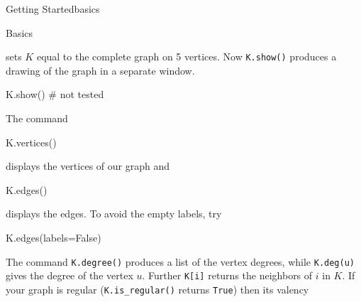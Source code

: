 \begin{chap}{Getting Started}{basics}
\begin{sect}{Basics}
\begin{sagecode}
\begin{sageoutput}
\end{sageoutput}
\end{sagecode}
%
\begin{para}
sets $K$ equal to the complete graph on 5 vertices.  
Now \verb|K.show()| produces a drawing of the graph in a separate window. 
\end{para}
%
\begin{sagecode}
\begin{sageinput}
K.show()   # not tested
\end{sageinput}
\end{sagecode}
%
\begin{para}
The command
\end{para}
%
\begin{sagecode}
\begin{sageinput}
K.vertices()
\end{sageinput}
\begin{sageoutput}
[0, 1, 2, 3, 4]
\end{sageoutput}
\end{sagecode}
%
\begin{para}
displays the vertices of our graph and
\end{para}
%
\begin{sagecode}
\begin{sageinput}
K.edges()
\end{sageinput}
\begin{sageoutput}
\end{sageoutput}
\end{sagecode}
%
\begin{para}
displays the edges. To avoid the empty labels, try
\end{para}
%
\begin{sagecode}
\begin{sageinput}
K.edges(labels=False)
\end{sageinput}
\begin{sageoutput}
[(0, 1), (0, 2), (0, 3), (0, 4), (1, 2), 
(1, 3), (1, 4), (2, 3), (2, 4), (3, 4)]
\end{sageoutput}
\end{sagecode}
%
\begin{para}
The command \verb|K.degree()| produces a list of the vertex degrees,
while \verb|K.deg(u)| gives the degree of the vertex $u$. Further 
\verb|K[i]| returns the neighbors of $i$ in $K$. If your graph is
regular (\verb|K.is_regular()| returns \verb|True|) then its valency

\end{para}
\end{sect}
\end{chap}
